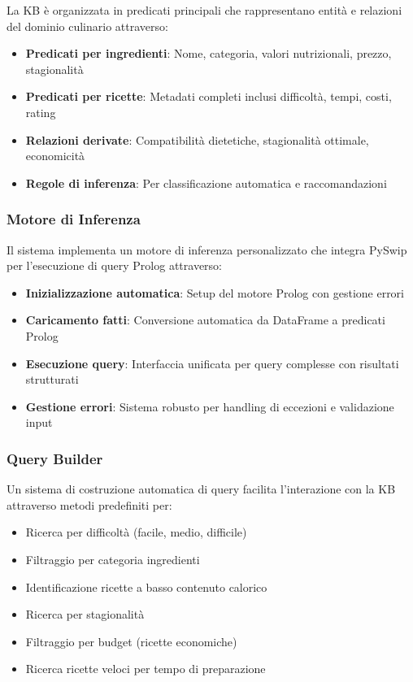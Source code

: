 \documentclass[12pt,a4paper]{article}
\begin{document}
La KB è organizzata in predicati principali che rappresentano entità e relazioni del dominio culinario attraverso:
\begin{itemize}
    \item \textbf{Predicati per ingredienti}: Nome, categoria, valori nutrizionali, prezzo, stagionalità
    \item \textbf{Predicati per ricette}: Metadati completi inclusi difficoltà, tempi, costi, rating
    \item \textbf{Relazioni derivate}: Compatibilità dietetiche, stagionalità ottimale, economicità
    \item \textbf{Regole di inferenza}: Per classificazione automatica e raccomandazioni
\end{itemize}

\subsubsection{Motore di Inferenza}

Il sistema implementa un motore di inferenza personalizzato che integra PySwip per l'esecuzione di query Prolog attraverso:
\begin{itemize}
    \item \textbf{Inizializzazione automatica}: Setup del motore Prolog con gestione errori
    \item \textbf{Caricamento fatti}: Conversione automatica da DataFrame a predicati Prolog
    \item \textbf{Esecuzione query}: Interfaccia unificata per query complesse con risultati strutturati
    \item \textbf{Gestione errori}: Sistema robusto per handling di eccezioni e validazione input
\end{itemize}

\subsubsection{Query Builder}

Un sistema di costruzione automatica di query facilita l'interazione con la KB attraverso metodi predefiniti per:
\begin{itemize}
    \item Ricerca per difficoltà (facile, medio, difficile)
    \item Filtraggio per categoria ingredienti
    \item Identificazione ricette a basso contenuto calorico
    \item Ricerca per stagionalità
    \item Filtraggio per budget (ricette economiche)
    \item Ricerca ricette veloci per tempo di preparazione
\end{itemize}
\end{document}
